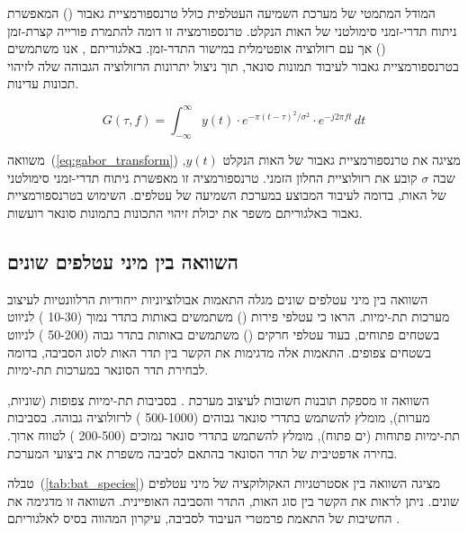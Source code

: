 המודל המתמטי של מערכת השמיעה העטלפית כולל טרנספורמציית גאבור () המאפשרת ניתוח תדרי-זמני סימולטני של האות הנקלט. טרנספורמציה זו דומה להתמרת פורייה קצרת-זמן () אך עם רזולוציה אופטימלית במישור התדר-זמן. באלגוריתם , אנו משתמשים בטרנספורמציית גאבור לעיבוד תמונות סונאר, תוך ניצול יתרונות הרזולוציה הגבוהה שלה לזיהוי תכונות עדינות.

\begin{equation}
G(\tau, f) = \int_{-\infty}^{\infty} y(t) \cdot e^{-\pi (t-\tau)^2 / \sigma^2} \cdot e^{-j2\pi ft} \, dt
\label{eq:gabor_transform}
\end{equation}

משוואה~(\ref{eq:gabor_transform}) מציגה את טרנספורמציית גאבור של האות הנקלט $y(t)$, שבה $\sigma$ קובע את רזולוציית החלון הזמני. טרנספורמציה זו מאפשרת ניתוח תדרי-זמני סימולטני של האות, בדומה לעיבוד המבוצע במערכת השמיעה של עטלפים. השימוש בטרנספורמציית גאבור באלגוריתם  משפר את יכולת זיהוי התכונות בתמונות סונאר רועשות.

\subsection{השוואה בין מיני עטלפים שונים}
\label{sec:bat_species_comparison}

השוואה בין מיני עטלפים שונים מגלה התאמות אבולוציוניות ייחודיות הרלוונטיות לעיצוב מערכות  תת-ימיות. \citet{GriffithBatEcholocation} הראו כי עטלפי פירות () משתמשים באותות  בתדר נמוך (10-30 ) לניווט בשטחים פתוחים, בעוד עטלפי חרקים () משתמשים באותות  בתדר גבוה (50-200 ) לניווט בשטחים צפופים. התאמות אלה מדגימות את הקשר בין תדר האות לסוג הסביבה, בדומה לבחירת תדר הסונאר במערכות תת-ימיות.

השוואה זו מספקת תובנות חשובות לעיצוב מערכת . בסביבות תת-ימיות צפופות (שוניות, מערות), מומלץ להשתמש בתדרי סונאר גבוהים (500-1000 ) לרזולוציה גבוהה. בסביבות תת-ימיות פתוחות (ים פתוח), מומלץ להשתמש בתדרי סונאר נמוכים (200-500 ) לטווח ארוך. בחירה אדפטיבית של תדר הסונאר בהתאם לסביבה משפרת את ביצועי המערכת.

\begin{table}[htbp]
    \centering
    \caption{השוואה בין אסטרטגיות אקולוקציה של מיני עטלפים שונים. (Comparison of echolocation strategies across different bat species.)}
    \label{tab:bat_species}
\end{table}

טבלה~(\ref{tab:bat_species}) מציגה השוואה בין אסטרטגיות האקולוקציה של מיני עטלפים שונים. ניתן לראות את הקשר בין סוג האות, התדר והסביבה האופיינית. השוואה זו מדגימה את החשיבות של התאמת פרמטרי העיבוד לסביבה, עיקרון המהווה בסיס לאלגוריתם .
